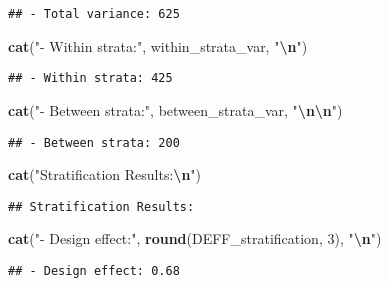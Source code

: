 \documentclass[
]{article}
\newenvironment{Shaded}{\begin{snugshade}}{\end{snugshade}}
\newcommand{\DecValTok}[1]{\textcolor[rgb]{0.00,0.00,0.81}{#1}}
\newcommand{\FunctionTok}[1]{\textcolor[rgb]{0.13,0.29,0.53}{\textbf{#1}}}
\newcommand{\NormalTok}[1]{#1}
\newcommand{\SpecialCharTok}[1]{\textcolor[rgb]{0.81,0.36,0.00}{\textbf{#1}}}
\newcommand{\StringTok}[1]{\textcolor[rgb]{0.31,0.60,0.02}{#1}}
\begin{document}
\begin{verbatim}
## - Total variance: 625
\end{verbatim}

\begin{Shaded}
\begin{Highlighting}[]
\FunctionTok{cat}\NormalTok{(}\StringTok{"{-} Within strata:"}\NormalTok{, within\_strata\_var, }\StringTok{"}\SpecialCharTok{\textbackslash{}n}\StringTok{"}\NormalTok{)}
\end{Highlighting}
\end{Shaded}

\begin{verbatim}
## - Within strata: 425
\end{verbatim}

\begin{Shaded}
\begin{Highlighting}[]
\FunctionTok{cat}\NormalTok{(}\StringTok{"{-} Between strata:"}\NormalTok{, between\_strata\_var, }\StringTok{"}\SpecialCharTok{\textbackslash{}n\textbackslash{}n}\StringTok{"}\NormalTok{)}
\end{Highlighting}
\end{Shaded}

\begin{verbatim}
## - Between strata: 200
\end{verbatim}

\begin{Shaded}
\begin{Highlighting}[]
\FunctionTok{cat}\NormalTok{(}\StringTok{"Stratification Results:}\SpecialCharTok{\textbackslash{}n}\StringTok{"}\NormalTok{)}
\end{Highlighting}
\end{Shaded}

\begin{verbatim}
## Stratification Results:
\end{verbatim}

\begin{Shaded}
\begin{Highlighting}[]
\FunctionTok{cat}\NormalTok{(}\StringTok{"{-} Design effect:"}\NormalTok{, }\FunctionTok{round}\NormalTok{(DEFF\_stratification, }\DecValTok{3}\NormalTok{), }\StringTok{"}\SpecialCharTok{\textbackslash{}n}\StringTok{"}\NormalTok{)}
\end{Highlighting}
\end{Shaded}

\begin{verbatim}
## - Design effect: 0.68
\end{verbatim}
\end{document}
